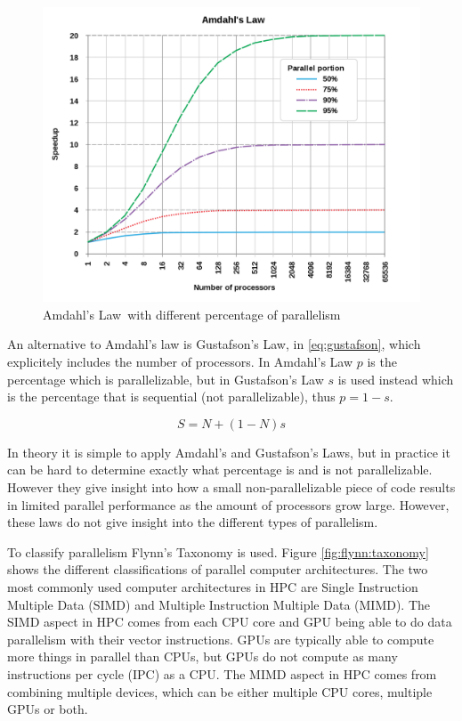 \begin{figure}[H]
    \centering
    \includegraphics[scale=0.16]{Figures/amdahl.png}
    \caption[]{Amdahl's Law\protect\footnotemark\ with different percentage of parallelism}
    \label{fig:amdahl}
\end{figure} 

An alternative to Amdahl's law is Gustafson's Law, in \eqref{eq:gustafson}, which explicitely includes the number of processors. In Amdahl's Law $p$ is the percentage which is parallelizable, but in Gustafson's Law $s$ is used instead which is the percentage that is sequential (not parallelizable), thus $p = 1-s$.

\begin{equation}
  \label{eq:gustafson}
  S = N + (1 - N)s
\end{equation}

In theory it is simple to apply Amdahl's and Gustafson's Laws, but in practice it can be hard to determine exactly what percentage is and is not parallelizable. However they give insight into how a small non-parallelizable piece of code results in limited parallel performance as the amount of processors grow large. However, these laws do not give insight into the different types of parallelism.

To classify parallelism Flynn's Taxonomy is used. Figure \ref{fig:flynn:taxonomy} shows the different classifications of parallel computer architectures. The two most commonly used computer architectures in HPC are Single Instruction Multiple Data (SIMD) and Multiple Instruction Multiple Data (MIMD). The SIMD aspect in HPC comes from each CPU core and GPU being able to do data parallelism with their vector instructions. GPUs are typically able to compute more things in parallel than CPUs, but GPUs do not compute as many instructions per cycle (IPC) as a CPU. The MIMD aspect in HPC comes from combining multiple devices, which can be either multiple CPU cores, multiple GPUs or both.

